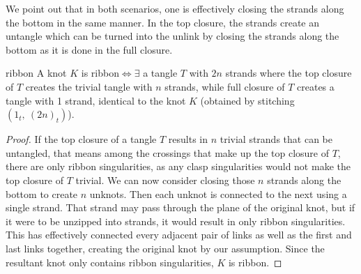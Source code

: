 \begin{paper}

We point out that in both scenarios, one is effectively closing the strands
along the bottom in the same manner.
In the top closure, the strands create an untangle which can be turned into the
unlink by closing the strands along the bottom as it is done in the
full closure.

\begin{papertheorem}{ribbon}
A knot $K$ is ribbon$\iff\exists$ a tangle $T$ with $2n$ strands where the
top closure of $T$ creates the trivial tangle with $n$ strands, while
full closure of $T$ creates a tangle with 1 strand, identical to the knot $K$
(obtained by stitching $(1_t,~(2n)_t)$).
\end{papertheorem}
\begin{proof}
If the top closure of a tangle $T$ results in $n$ trivial strands that can be
untangled, that means among the crossings that make up the top closure of $T$,
there are only ribbon singularities, as any clasp singularities would not make
the top closure of $T$ trivial.
We can now consider closing those $n$ strands along the bottom to create $n$
unknots.
Then each unknot is connected to the next using a single strand.
That strand may pass through the plane of the original knot, but if it were to
be unzipped into strands, it would result in only ribbon singularities.
This has effectively connected every adjacent pair of links as well as the first
and last links together, creating the original knot by our assumption.
Since the resultant knot only contains ribbon singularities, $K$ is ribbon.


\end{proof}
\end{paper}
